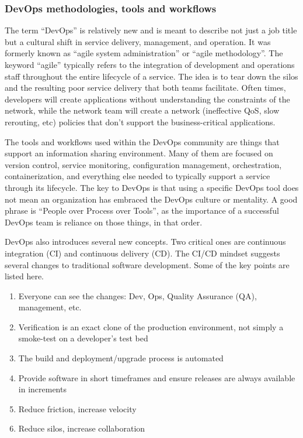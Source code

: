 \subsubsection{DevOps methodologies, tools and workflows}
The term ``DevOps'' is relatively new and is meant to describe not just a job
title but a cultural shift in service delivery, management, and operation. It
was formerly known as ``agile system administration'' or ``agile
methodology''. The keyword ``agile'' typically refers to the integration of
development and operations staff throughout the entire lifecycle of a service.
The idea is to tear down the silos and the resulting poor service delivery
that both teams facilitate. Often times, developers will create applications
without understanding the constraints of the network, while the network team
will create a network (ineffective QoS, slow rerouting, etc) policies that
don’t support the business-critical applications.

The tools and workflows used within the DevOps community are things that
support an information sharing environment. Many of them are focused on
version control, service monitoring, configuration management, orchestration,
containerization, and everything else needed to typically support a service
through its lifecycle. The key to DevOps is that using a specific DevOps tool
does not mean an organization has embraced the DevOps culture or mentality. A
good phrase is ``People over Process over Tools'', as the importance of a
successful DevOps team is reliance on those things, in that order.

DevOps also introduces several new concepts. Two critical ones are continuous
integration (CI) and continuous delivery (CD). The CI/CD mindset suggests
several changes to traditional software development. Some of the key points
are listed here.

\begin{enumerate}
  \item	Everyone can see the changes: Dev, Ops, Quality Assurance (QA),
  management, etc.
  \item	Verification is an exact clone of the production environment, not
  simply a smoke-test on a developer’s test bed
  \item	The build and deployment/upgrade process is automated
  \item	Provide software in short timeframes and ensure releases are always
  available in increments
  \item	Reduce friction, increase velocity
  \item	Reduce silos, increase collaboration
\end{enumerate}

